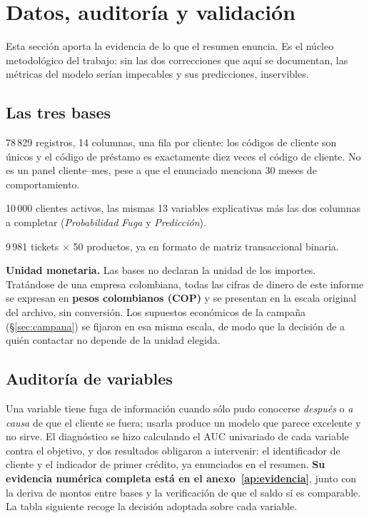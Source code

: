 \documentclass[11pt,a4paper]{article}
\begin{document}
\section{Datos, auditoría y validación}
\label{sec:datos}

Esta sección aporta la evidencia de lo que el resumen enuncia. Es el núcleo
metodológico del trabajo: sin las dos correcciones que aquí se documentan, las
métricas del modelo serían impecables y sus predicciones, inservibles.

\subsection{Las tres bases}

\begin{description}[leftmargin=1.4em,style=nextline,nosep]
\item[Base de Datos Modelo] 78\,829 registros, 14 columnas, una fila por cliente:
      los códigos de cliente son únicos y el código de préstamo es exactamente
      diez veces el código de cliente. No es un panel cliente--mes, pese a que el
      enunciado menciona 30 meses de comportamiento.
\item[Base de Datos Predicción] 10\,000 clientes activos, las mismas 13 variables
      explicativas más las dos columnas a completar (\emph{Probabilidad Fuga} y
      \emph{Predicción}).
\item[Bakery] 9\,981 tickets $\times$ 50 productos, ya en formato de matriz
      transaccional binaria.
\end{description}

\begin{nota}
\small \textbf{Unidad monetaria.} Las bases no declaran la unidad de los importes.
Tratándose de una empresa colombiana, todas las cifras de dinero de este informe
se expresan en \textbf{pesos colombianos (COP)} y se presentan en la escala
original del archivo, sin conversión. Los supuestos económicos de la campaña
(\S\ref{sec:campana}) se fijaron en esa misma escala, de modo que la decisión de
a quién contactar no depende de la unidad elegida.
\end{nota}

\subsection{Auditoría de variables}
\label{sec:auditoria}

Una variable tiene fuga de información cuando sólo pudo conocerse \emph{después}
o \emph{a causa} de que el cliente se fuera; usarla produce un modelo que parece
excelente y no sirve. El diagnóstico se hizo calculando el AUC univariado de cada
variable contra el objetivo, y dos resultados obligaron a intervenir: el
identificador de cliente y el indicador de primer crédito, ya enunciados en el
resumen. \textbf{Su evidencia numérica completa está en el anexo~\ref{ap:evidencia}},
junto con la deriva de montos entre bases y la verificación de que el saldo sí es
comparable. La tabla siguiente recoge la decisión adoptada sobre cada variable.
\end{document}
